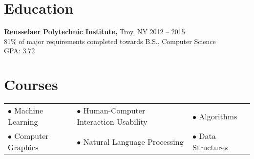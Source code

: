 \documentclass[margin]{res}
\begin{document}
\begin{minipage}{\textwidth}
\begin{resume}
\section{Education}
{\bf Rensselaer Polytechnic Institute,} Troy, NY \hfill 2012 -- 2015 \\
81\% of major requirements completed towards B.S., Computer Science \\
GPA: 3.72

\section{Courses}
\begin{tabular}{lll}
$\bullet$ Machine Learning & $\bullet$ Human-Computer Interaction Usability & $\bullet$ Algorithms \\
$\bullet$ Computer Graphics & $\bullet$ Natural Language Processing & $\bullet$ Data Structures \\
\end{tabular}

\end{resume}
\end{minipage}
\end{document}
